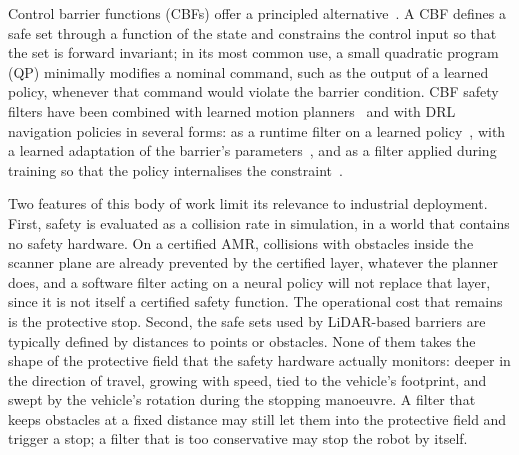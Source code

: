 \documentclass[sensors,article,submit,moreauthors]{Definitions/mdpi}
\begin{document}
Control barrier functions (CBFs) offer a principled alternative~\citep{ames2017cbfqp,ames2019cbf}. A CBF defines a safe set through a function of the state and constrains the control input so that the set is forward invariant; in its most common use, a small quadratic program (QP) minimally modifies a nominal command, such as the output of a learned policy, whenever that command would violate the barrier condition. CBF safety filters have been combined with learned motion planners~\citep{wang2022ensuring} and with DRL navigation policies in several forms: as a runtime filter on a learned policy~\citep{guo2025radar}, with a learned adaptation of the barrier's parameters~\citep{mohammad2025sacadapt,mohammad2025corridor}, and as a filter applied during training so that the policy internalises the constraint~\citep{cheng2019endtoend,yang2025cbfrl}.

Two features of this body of work limit its relevance to industrial deployment. First, safety is evaluated as a collision rate in simulation, in a world that contains no safety hardware. On a certified AMR, collisions with obstacles inside the scanner plane are already prevented by the certified layer, whatever the planner does, and a software filter acting on a neural policy will not replace that layer, since it is not itself a certified safety function. The operational cost that remains is the protective stop. Second, the safe sets used by LiDAR-based barriers are typically defined by distances to points or obstacles. None of them takes the shape of the protective field that the safety hardware actually monitors: deeper in the direction of travel, growing with speed, tied to the vehicle's footprint, and swept by the vehicle's rotation during the stopping manoeuvre. A filter that keeps obstacles at a fixed distance may still let them into the protective field and trigger a stop; a filter that is too conservative may stop the robot by itself.
\end{document}
